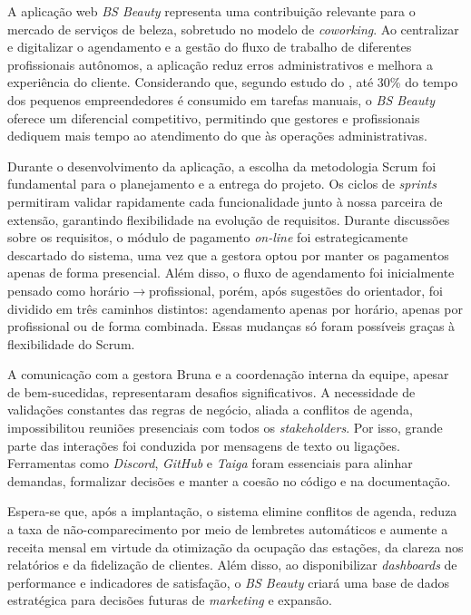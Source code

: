 

A aplicação web \emph{BS Beauty} representa uma contribuição relevante para o mercado de serviços de beleza, sobretudo no modelo de \emph{coworking}. Ao centralizar e digitalizar o agendamento e a gestão do fluxo de trabalho de diferentes profissionais autônomos, a aplicação reduz erros administrativos e melhora a experiência do cliente. Considerando que, segundo estudo do \cite{senac2022}, até 30\% do tempo dos pequenos empreendedores é consumido em tarefas manuais, o \emph{BS Beauty} oferece um diferencial competitivo, permitindo que gestores e profissionais dediquem mais tempo ao atendimento do que às operações administrativas.

Durante o desenvolvimento da aplicação, a escolha da metodologia Scrum foi fundamental para o planejamento e a entrega do projeto. Os ciclos de \emph{sprints} permitiram validar rapidamente cada funcionalidade junto à nossa parceira de extensão, garantindo flexibilidade na evolução de requisitos. Durante discussões sobre os requisitos, o módulo de pagamento \emph{on-line} foi estrategicamente descartado do sistema, uma vez que a gestora optou por manter os pagamentos apenas de forma presencial. Além disso, o fluxo de agendamento foi inicialmente pensado como horário$\to$profissional, porém, após sugestões do orientador, foi dividido em três caminhos distintos: agendamento apenas por horário, apenas por profissional ou de forma combinada. Essas mudanças só foram possíveis graças à flexibilidade do Scrum.

A comunicação com a gestora Bruna e a coordenação interna da equipe, apesar de bem-sucedidas, representaram desafios significativos. A necessidade de validações constantes das regras de negócio, aliada a conflitos de agenda, impossibilitou reuniões presenciais com todos os \emph{stakeholders}. Por isso, grande parte das interações foi conduzida por mensagens de texto ou ligações. Ferramentas como \emph{Discord}, \emph{GitHub} e \emph{Taiga} foram essenciais para alinhar demandas, formalizar decisões e manter a coesão no código e na documentação.

Espera-se que, após a implantação, o sistema elimine conflitos de agenda, reduza a taxa de não-comparecimento por meio de lembretes automáticos e aumente a receita mensal em virtude da otimização da ocupação das estações, da clareza nos relatórios e da fidelização de clientes. Além disso, ao disponibilizar \emph{dashboards} de performance e indicadores de satisfação, o \emph{BS Beauty} criará uma base de dados estratégica para decisões futuras de \emph{marketing} e expansão.

